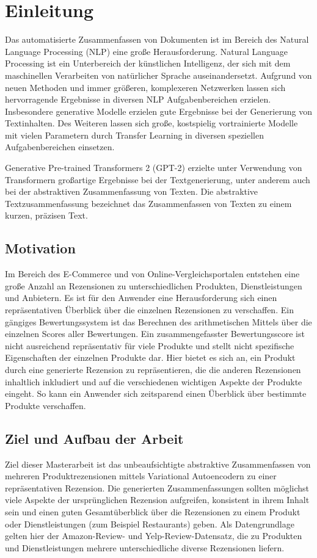 \section{Einleitung}\raggedbottom
Das automatisierte Zusammenfassen von Dokumenten ist im Bereich des Natural Language Processing (NLP) eine große Herausforderung.
Natural Language Processing ist ein Unterbereich der künstlichen Intelligenz, der sich mit dem maschinellen Verarbeiten von natürlicher Sprache auseinandersetzt. 
Aufgrund von neuen Methoden und immer größeren, komplexeren Netzwerken lassen sich hervorragende Ergebnisse in diversen NLP Aufgabenbereichen erzielen. 
Insbesondere generative Modelle erzielen gute Ergebnisse bei der Generierung von Textinhalten. 
Des Weiteren lassen sich große, kostspielig vortrainierte Modelle mit vielen Parametern durch Transfer Learning in diversen speziellen Aufgabenbereichen einsetzen. 

Generative Pre-trained Transformers 2 (GPT-2) erzielte unter Verwendung von Transformern großartige Ergebnisse bei der Textgenerierung, unter anderem auch bei der abstraktiven Zusammenfassung von Texten. 
Die abstraktive Textzusammenfassung bezeichnet das Zusammenfassen von Texten zu einem kurzen, präzisen Text. 

\subsection{Motivation}
Im Bereich des E-Commerce und von Online-Vergleichsportalen entstehen eine große Anzahl an Rezensionen zu unterschiedlichen Produkten, Dienstleistungen und Anbietern.
Es ist für den Anwender eine Herausforderung sich einen repräsentativen Überblick über die einzelnen Rezensionen zu verschaffen. 
Ein gängiges Bewertungssystem ist das Berechnen des arithmetischen Mittels über die einzelnen Scores aller Bewertungen. 
Ein zusammengefasster Bewertungsscore ist nicht ausreichend repräsentativ für viele Produkte und stellt nicht spezifische Eigenschaften der einzelnen Produkte dar.
Hier bietet es sich an, ein Produkt durch eine generierte Rezension zu repräsentieren, die die anderen Rezensionen inhaltlich inkludiert und auf die verschiedenen wichtigen Aspekte der Produkte eingeht.
So kann ein Anwender sich zeitsparend einen Überblick über bestimmte Produkte verschaffen.

\subsection{Ziel und Aufbau der Arbeit}
Ziel dieser Masterarbeit ist das unbeaufsichtigte abstraktive Zusammenfassen von mehreren Produktrezensionen mittels Variational Autoencodern zu einer repräsentativen Rezension.
Die generierten Zusammenfassungen sollten möglichst viele Aspekte der ursprünglichen Rezension aufgreifen, konsistent in ihrem Inhalt sein und einen guten Gesamtüberblick über die Rezensionen zu einem Produkt oder Dienstleistungen (zum Beispiel Restaurants) geben.
Als Datengrundlage gelten hier der Amazon-Review- und Yelp-Review-Datensatz, die zu Produkten und Dienstleistungen mehrere unterschiedliche diverse Rezensionen liefern.

